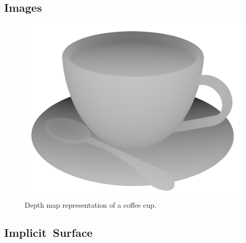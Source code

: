 \subsection{Images}

\begin{figure}[ht]
	\centering
	\includegraphics[scale=0.2]{Images/Depth Map Cup}
	\caption{Depth map representation of a coffee cup.}
	\label{fig:depth_map_cup}
\end{figure}

\subsection{Implicit~Surface}
\label{subsec:implicit_surface}

